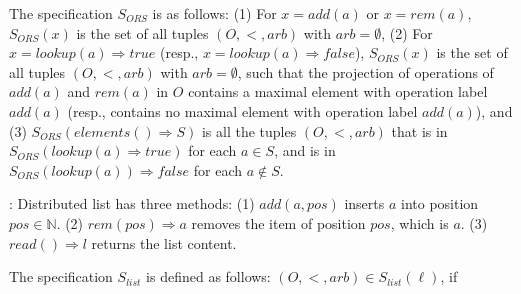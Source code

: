 
The specification $S_{\mathit{ORS}}$ is as follows: (1) For $x=add(a)$ or $x = rem(a)$, $S_{\mathit{ORS}}(x)$ is the set of all tuples $(O,<,arb)$ with $arb = \emptyset$, (2) For $x=lookup(a) \Rightarrow \mathit{true}$ (resp., $x=lookup(a) \Rightarrow \mathit{false}$), $S_{\mathit{ORS}}(x)$ is the set of all tuples $(O,<,arb)$ with $arb = \emptyset$, such that the projection of operations of $add(a)$ and $rem(a)$ in $O$ contains a maximal element with operation label $add(a)$ (resp., contains no maximal element with operation label $add(a)$), and (3) $S_{\mathit{ORS}}(elements() \Rightarrow S)$ is all the tuples $(O,<,arb)$ that is in $S_{\mathit{ORS}}(lookup(a) \Rightarrow \mathit{true})$ for each $a \in S$, and is in $S_{\mathit{ORS}}(lookup(a)) \Rightarrow \mathit{false}$ for each $a \notin S$.

: Distributed list has three methods: (1) $add(a,pos)$ inserts $a$ into position $pos \in \mathbb{N}$. (2) $rem(pos) \Rightarrow a$ removes the item of position $pos$, which is $a$. (3) $read() \Rightarrow l$ returns the list content.

The specification $S_{\mathit{list}}$ is defined as follows: $(O,<,arb) \in S_{\mathit{list}}(\ell)$, if


